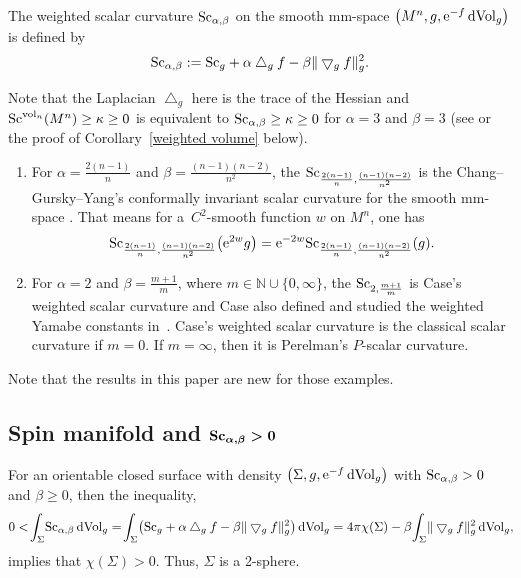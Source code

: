\documentclass[pdftex]{sigma}
\begin{document}
 \begin{Definition}
 The weighted scalar curvature ${\rm Sc}_{\alpha, \beta}$ on the smooth mm-space $\big(M^n, g, {\rm e}^{-f}\,{\rm dVol}_g\big)$ is defined by
 \begin{gather*}
 {\rm Sc}_{\alpha, \beta}:= {\rm Sc}_g + \alpha \bigtriangleup_gf - \beta\| \bigtriangledown_gf\|^2_g.
 \end{gather*}
 \end{Definition}
 Note that the Laplacian $\bigtriangleup_g$ here is the trace of the Hessian and ${\rm Sc}^{{\rm vol}_n}(M^n)\geq \kappa\geq 0$ is equivalent to ${\rm Sc}_{\alpha, \beta}\geq \kappa\geq 0$ for $\alpha=3$ and $\beta=3$ (see \cite[Theorem~8]{MR1458581} or the proof of Corollary~\ref{weighted volume} below).
 \begin{Example}\quad
 \begin{enumerate}\itemsep=0pt
 \item[1.] For $\alpha=\frac{2(n-1)}{n}$ and $\beta=\frac{(n-1)(n-2)}{n^2}$, the ${\rm Sc}_{\frac{2(n-1)}{n}, \frac{(n-1)(n-2)}{n^2}}$ is the Chang--Gursky--Yang's conformally invariant scalar curvature for the smooth mm-space \cite{MR2203156}. That means for a~$C^2$-smooth function $w$ on $M^n$, one has
 \begin{align*}
 {\rm Sc}_{\frac{2(n-1)}{n}, \frac{(n-1)(n-2)}{n^2}}\big({\rm e}^{2w}g\big)={\rm e}^{-2w}{\rm Sc}_{\frac{2(n-1)}{n}, \frac{(n-1)(n-2)}{n^2}}(g).
\end{align*}
\item[2.] For $\alpha=2$ and $\beta=\frac{m+1}{m}$, where $m\in \mathbb{N}\cup \{0, \infty\}$, the ${\rm Sc}_{2, \frac{m+1}{m}}$ is Case's weighted scalar curvature and Case also defined and studied the weighted Yamabe constants in~\cite{MR3116020}. Case's weighted scalar curvature is the classical scalar curvature if $m=0$. If $m=\infty$, then it is Perelman's $P$-scalar curvature.
 \end{enumerate}
\end{Example}
Note that the results in this paper are new for those examples.

 \subsection[Spin manifold and Sc(alpha,beta)>0]{Spin manifold and $\boldsymbol{{\rm Sc}_{\alpha, \beta}> 0}$}
 For an orientable closed surface with density $\big(\Sigma, g, {\rm e}^{-f}\,{\rm dVol}_g\big)$ with ${\rm Sc}_{\alpha, \beta} > 0$ and $\beta\geq 0$, then the inequality,
\begin{gather*}
0 < \!\int_\Sigma\! {\rm Sc}_{\alpha, \beta} \,{\rm dVol}_g = \!\int_\Sigma\! \big({\rm Sc}_g + \alpha\bigtriangleup_gf - \beta\|\bigtriangledown_gf\|_g^2\big) \,{\rm dVol}_g
 = 4\pi\chi(\Sigma) - \beta\!\int_\Sigma\! \|\bigtriangledown_gf\|_g^2 \,{\rm dVol}_g,\!
\end{gather*}
implies that $\chi(\Sigma)> 0$. Thus, $\Sigma$ is a 2-sphere.
\end{document}
